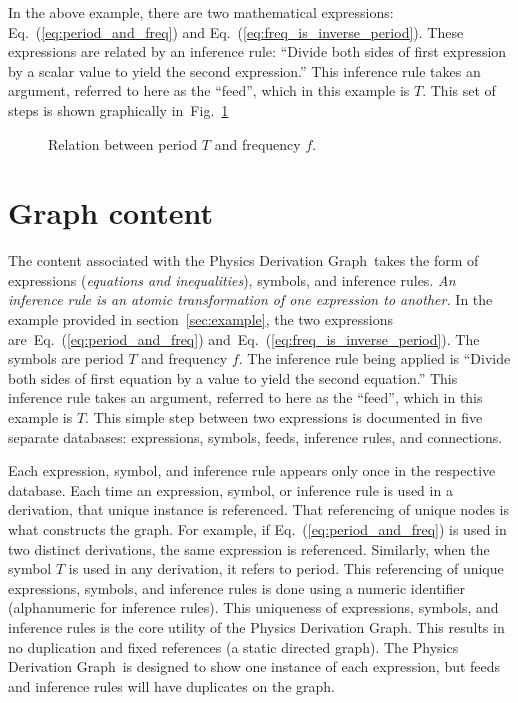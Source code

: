 \documentclass{article}
\newcommand{\eqn}[1]{Eq.\ (\ref{#1})}
\newcommand{\pdg}{Physics Derivation Graph}
\begin{document}
\begin{multicols}{2}
In the above example, there are two mathematical expressions: \eqn{eq:period_and_freq} and \eqn{eq:freq_is_inverse_period}. These expressions are related by an inference rule: ``Divide both sides of first expression by a scalar value to yield the second expression.'' This inference rule takes an argument, referred to here as the ``feed'', which in this example is $T$. This set of steps is shown graphically in~Fig.~\ref{fig:freq_period}

\begin{center}
\begin{figure}
\caption{Relation between period $T$ and frequency $f$.\label{fig:freq_period}}
\end{figure}
\end{center}

\section{Graph content\label{sec:content}}

The content associated with the \pdg\ takes the form of expressions (\textit{equations and inequalities}), symbols, and inference rules. \textit{An inference rule is an atomic transformation of one expression to another.} In the example provided in section~\ref{sec:example}, the two expressions are~\eqn{eq:period_and_freq} and~\eqn{eq:freq_is_inverse_period}. The symbols are period $T$ and frequency $f$. The inference rule being applied is ``Divide both sides of first equation by a value to yield the second equation.'' This inference rule takes an argument, referred to here as the ``feed'', which in this example is $T$. This simple step between two expressions is documented in five separate databases: expressions, symbols, feeds, inference rules, and connections. 

Each expression, symbol, and inference rule appears only once in the respective database. Each time an expression, symbol, or inference rule is used in a derivation, that unique instance is referenced. That referencing of unique nodes is what constructs the graph. For example, if \eqn{eq:period_and_freq} is used in two distinct derivations, the same expression is referenced. Similarly, when the symbol $T$ is used in any derivation, it refers to period. This referencing of unique expressions, symbols, and inference rules is done using a numeric identifier (alphanumeric for inference rules). This uniqueness of expressions, symbols, and inference rules is the core utility of the \pdg. This results in no duplication and fixed references (a static directed graph). The \pdg\ is designed to show one instance of each expression, but feeds and inference rules will have duplicates on the graph. 


\end{multicols}
\end{document}
